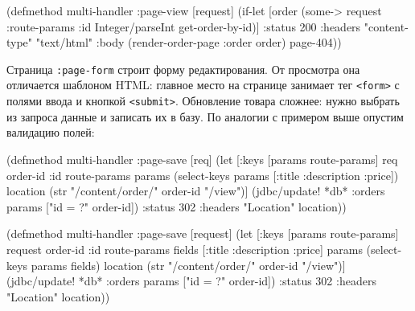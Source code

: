 \else

\begin{english}
  \begin{clojure}
(defmethod multi-handler :page-view
  [request]
  (if-let [order (some-> request
                         :route-params
                         :id
                         Integer/parseInt
                         get-order-by-id)]
    {:status 200
     :headers {"content-type" "text/html"}
     :body (render-order-page {:order order})}
    page-404))
  \end{clojure}
\end{english}

\fi

Страница \verb|:page-form| строит форму редактирования. От просмотра она
отличается шаблоном HTML: главное место на странице занимает тег \verb|<form>| с
полями ввода и кнопкой \verb|<submit>|. Обновление товара сложнее: нужно выбрать
из запроса данные и записать их в базу. По аналогии с примером выше опустим
валидацию полей:

\ifnarrow

\begin{english}
  \begin{clojure}
(defmethod multi-handler :page-save
  [req]
  (let [{:keys [params route-params]} req
        {order-id :id} route-params
        params (select-keys params
                 [:title :description
                  :price])
        location (str "/content/order/"
                   order-id "/view")]
    (jdbc/update! *db* :orders
      params ["id = ?" order-id])
    {:status 302
     :headers {"Location" location}}))
  \end{clojure}
\end{english}

\else

\begin{english}
  \begin{clojure}
(defmethod multi-handler :page-save
  [request]
  (let [{:keys [params route-params]} request
        {order-id :id} route-params
        fields [:title :description :price]
        params (select-keys params fields)
        location (str "/content/order/" order-id "/view")]
    (jdbc/update! *db* :orders params ["id = ?" order-id])
    {:status 302
     :headers {"Location" location}}))
  \end{clojure}
\end{english}

\fi




